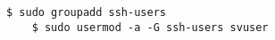 \begin{lstlisting}[language=term,caption=Ändern des Passworts,label=passwd]
    $ sudo groupadd ssh-users
    $ sudo usermod -a -G ssh-users svuser
\end{lstlisting}